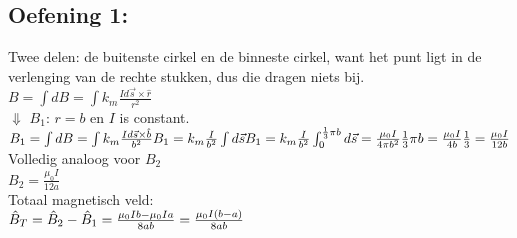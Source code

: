 \documentclass[../Oefenzitting4.tex]{subfiles}
\begin{document}
  \subsection{Oefening 1:}
    Twee delen: de buitenste cirkel en de binneste cirkel, want het punt ligt in de verlenging van de rechte stukken, dus die dragen niets bij.
    \\
    $
      B = \int dB = \int k_{m} \frac{I d\vec{s} \times \hat{r}}{r^{2}}
    $
    \\
    $\Downarrow$ $B_{1}$: $r=b$ en $I$ is constant.
    \\
    $
      B_{1} = \int dB = \int k_{m} \frac{I d\vec{s} \times \hat{b}}{b^{2}}
      \\
      B_{1} = k_{m}\frac{I}{b^{2}} \int d\vec{s}
      \\
      B_{1} = k_{m}\frac{I}{b^{2}} \int_0^{\frac{1}{3}\pi b} d\vec{s}
      \\
      = \frac{\mu_{0}I}{4\pi b^{2}} \frac{1}{3} \pi b
      \\
      = \frac{\mu_{0}I}{4b} \frac{1}{3}
      \\
      = \frac{\mu_{0}I}{12b}
    $
    \\
    Volledig analoog voor $B_{2}$
    \\
    $
      B_{2} = \frac{\mu_{0}I}{12a}
    $
    \\
    Totaal magnetisch veld:
    \\
    $
      \hat{B}_{T} = \hat{B}_{2} - \hat{B}_{1}
      \\
      = \frac{\mu_{0}Ib - \mu_{0}Ia}{8ab}
      \\
      = \frac{\mu_{0}I(b-a)}{8ab}
      \\
    $
\end{document}
